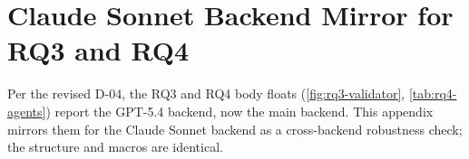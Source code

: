 \section{Claude Sonnet Backend Mirror for RQ3 and RQ4}
\label{sec:appendix:gpt-mirror}

Per the revised D-04, the RQ3 and RQ4 body floats (\autoref{fig:rq3-validator}, \autoref{tab:rq4-agents}) report the GPT-5.4 backend, now the main backend. This appendix mirrors them for the Claude Sonnet backend as a cross-backend robustness check; the structure and macros are identical.




